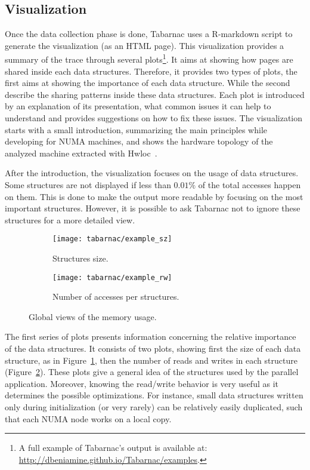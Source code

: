 \subsection{Visualization}

Once the data collection phase is done, \gls{Tabarnac} uses a \gls{R-markdown} script to generate the visualization (as an HTML page).
This visualization provides a summary of the trace through several plots\footnote{
    A full example of \gls{Tabarnac}'s output is available at:\\ \url{http://dbeniamine.github.io/Tabarnac/examples}.}.
It aims at showing how pages are shared inside each data structures.
Therefore, it provides two types of plots, the first aims at showing the importance of each data structure.
While the second describe the sharing patterns inside these data structures.
Each plot is introduced by an explanation of its presentation, what common issues it can help to understand and provides suggestions on how to fix these issues.
The visualization starts with a small introduction, summarizing the main principles while developing for \gls{NUMA} machines, and shows the hardware topology of the analyzed machine extracted
with Hwloc~\cite{Broquedis10hwloc}.

After the introduction, the visualization focuses on the usage of data structures.
Some structures are not displayed if less than $0.01\%$ of the total accesses happen on them.
This is done to make the output more readable by focusing on the most important structures.
However, it is possible to ask \gls{Tabarnac} not to ignore these structures for a more detailed view.

\begin{figure}[htb]
    \centering
    \begin{subfigure}{.49\linewidth}
        \texttt{[image: tabarnac/example\_sz]}
        \caption{Structures size.}
        \label{fig:example_sz}
    \end{subfigure}
    \begin{subfigure}{.49\linewidth}
        \texttt{[image: tabarnac/example\_rw]}
        \caption{Number of accesses per structures.}
        \label{fig:example_rw}
    \end{subfigure}
    \caption{Global views of the memory usage.}
    \label{fig:example_plot1}
\end{figure}

The first series of plots presents information concerning the relative importance of the data structures.
It consists of two plots, showing first the size of each data structure, as in Figure~\ref{fig:example_sz}, then the number of reads and writes in each structure (Figure~\ref{fig:example_rw}).
These plots give a general idea of the structures used by the parallel application.
Moreover, knowing the read/write behavior is very useful as it determines the possible optimizations.
For instance, small data structures written only during initialization (or very rarely) can be relatively easily
duplicated, such that each \gls{NUMA} node works on a local copy.

